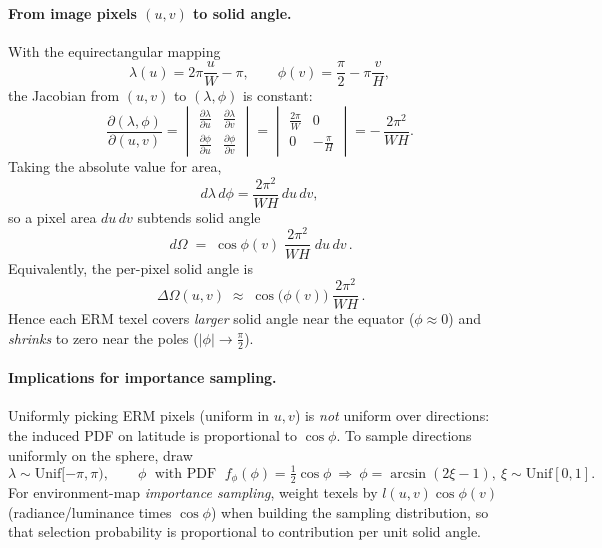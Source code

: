 \documentclass{article}
\begin{document}
\paragraph{From image pixels $(u,v)$ to solid angle.}
With the equirectangular mapping
\[
\lambda(u)=2\pi \frac{u}{W}-\pi,\qquad
\phi(v)=\frac{\pi}{2}-\pi\frac{v}{H},
\]
the Jacobian from $(u,v)$ to $(\lambda,\phi)$ is constant:
\[
\frac{\partial(\lambda,\phi)}{\partial(u,v)}
=
\begin{vmatrix}
\frac{\partial \lambda}{\partial u} & \frac{\partial \lambda}{\partial v}\\[2pt]
\frac{\partial \phi}{\partial u} & \frac{\partial \phi}{\partial v}
\end{vmatrix}
=
\begin{vmatrix}
\frac{2\pi}{W} & 0\\[2pt]
0 & -\frac{\pi}{H}
\end{vmatrix}
= -\,\frac{2\pi^2}{WH}.
\]
Taking the absolute value for area,
\[
d\lambda\, d\phi=\frac{2\pi^2}{WH}\, du\, dv,
\]
so a pixel area $du\,dv$ subtends solid angle
\[
\boxed{\, d\Omega \;=\; \cos\phi(v)\;\frac{2\pi^2}{WH}\; du\, dv\, }.
\]
Equivalently, the per-pixel solid angle is
\[
\boxed{\, \Delta\Omega(u,v) \;\approx\; \cos\!\big(\phi(v)\big)\;\frac{2\pi^2}{WH}\, }.
\]
Hence each ERM texel covers \emph{larger} solid angle near the equator ($\phi\approx 0$) and \emph{shrinks} to zero near the poles ($|\phi|\to \tfrac{\pi}{2}$).

\paragraph{Implications for importance sampling.}
Uniformly picking ERM pixels (uniform in $u,v$) is \emph{not} uniform over directions:
the induced PDF on latitude is proportional to $\cos\phi$. To sample directions
uniformly on the sphere, draw
\[
\lambda \sim \mathrm{Unif}[-\pi,\pi),\qquad
\phi \;\text{ with PDF }\; f_\phi(\phi)=\tfrac{1}{2}\cos\phi\ \Rightarrow\
\phi=\arcsin(2\xi-1),\ \xi\sim\mathrm{Unif}[0,1].
\]
For environment-map \emph{importance sampling}, weight texels by
$l(u,v)\cos\phi(v)$ (radiance/luminance times $\cos\phi$) when building the sampling distribution, so that selection probability is proportional to contribution per unit solid angle.
\end{document}
